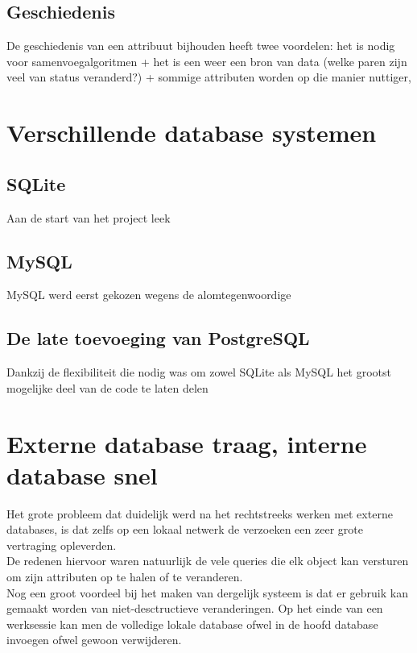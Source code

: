 \subsection{Geschiedenis}
De geschiedenis van een attribuut bijhouden heeft twee voordelen: het is nodig voor samenvoegalgoritmen + het is een weer een bron van data (welke paren zijn veel van status veranderd?) + sommige attributen worden op die manier nuttiger, 

\section{Verschillende database systemen}

\subsection{SQLite}
Aan de start van het project leek

\subsection{MySQL}
MySQL werd eerst gekozen wegens de alomtegenwoordige

\subsection{De late toevoeging van PostgreSQL}
Dankzij de flexibiliteit die nodig was om zowel SQLite als MySQL het grootst mogelijke deel van de code te laten delen

\section{Externe database traag, interne database snel}
Het grote probleem dat duidelijk werd na het rechtstreeks werken met externe databases, is dat zelfs op een lokaal netwerk de verzoeken een zeer grote vertraging opleverden.\\

De redenen hiervoor waren natuurlijk de vele queries die elk object kan versturen om zijn attributen op te halen of te veranderen.\\

Nog een groot voordeel bij het maken van dergelijk systeem is dat er gebruik kan gemaakt worden van niet-desctructieve veranderingen. Op het einde van een werksessie kan men de volledige
lokale database ofwel in de hoofd database invoegen ofwel gewoon verwijderen.\\

